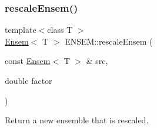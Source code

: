 \subsubsection{\texorpdfstring{rescaleEnsem()}{rescaleEnsem()}}
{\footnotesize\ttfamily template$<$class T $>$ \\
\mbox{\hyperlink{classENSEM_1_1Ensem}{Ensem}}$<$ T $>$ E\+N\+S\+E\+M\+::rescale\+Ensem (\begin{DoxyParamCaption}\item[{const \mbox{\hyperlink{classENSEM_1_1Ensem}{Ensem}}$<$ T $>$ \&}]{src,  }\item[{double}]{factor }\end{DoxyParamCaption})\hspace{0.3cm}{\ttfamily [inline]}}



Return a new ensemble that is rescaled. 

